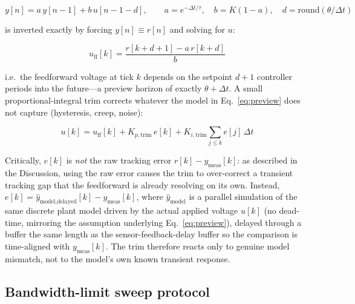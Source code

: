 \documentclass[fleqn,10pt]{wlscirep}
\begin{document}
\begin{equation}
y[n] = a\,y[n-1] + b\,u[n-1-d], \qquad a = e^{-\Delta t/\tau}, \quad b = K(1-a), \quad d = \mathrm{round}(\theta/\Delta t)
\end{equation}

is inverted exactly by forcing $y[n] \equiv r[n]$ and solving for $u$:

\begin{equation}
u_\text{ff}[k] = \frac{r[k+d+1] - a\,r[k+d]}{b}
\label{eq:preview}
\end{equation}

i.e.\ the feedforward voltage at tick $k$ depends on the setpoint $d+1$ controller periods into the future---a preview horizon of exactly $\theta + \Delta t$. A small proportional-integral trim corrects whatever the model in Eq.~\ref{eq:preview} does not capture (hysteresis, creep, noise):

\begin{equation}
u[k] = u_\text{ff}[k] + K_{p,\text{trim}}\,e[k] + K_{i,\text{trim}}\!\!\sum_{j\le k} e[j]\,\Delta t
\end{equation}

Critically, $e[k]$ is \emph{not} the raw tracking error $r[k]-y_\text{meas}[k]$: as described in the Discussion, using the raw error causes the trim to over-correct a transient tracking gap that the feedforward is already resolving on its own. Instead, $e[k] = \hat{y}_\text{model,delayed}[k] - y_\text{meas}[k]$, where $\hat{y}_\text{model}$ is a parallel simulation of the same discrete plant model driven by the actual applied voltage $u[k]$ (no dead-time, mirroring the assumption underlying Eq.~\ref{eq:preview}), delayed through a buffer the same length as the sensor-feedback-delay buffer so the comparison is time-aligned with $y_\text{meas}[k]$. The trim therefore reacts only to genuine model mismatch, not to the model's own known transient response.

\subsection*{Bandwidth-limit sweep protocol}
\end{document}
